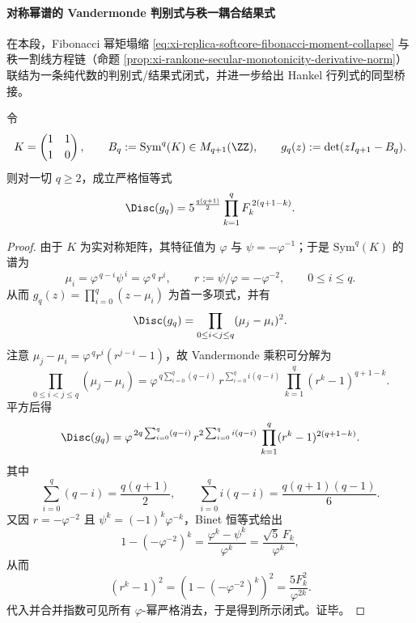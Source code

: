 \paragraph{对称幂谱的 Vandermonde 判别式与秩一耦合结果式}
在本段，Fibonacci 幂矩塌缩 \eqref{eq:xi-replica-softcore-fibonacci-moment-collapse} 与秩一割线方程链（命题 \ref{prop:xi-rankone-secular-monotonicity-derivative-norm}）联结为一条纯代数的判别式/结果式闭式，并进一步给出 Hankel 行列式的同型桥接。

\begin{theorem}\label{thm:xi-symq-k-discriminant-fibonacci-vandermonde}
令
\[
K=\begin{pmatrix}1&1\\[2pt]1&0\end{pmatrix},
\qquad
B_q:=\mathrm{Sym}^q(K)\in M_{q+1}(\ZZ),
\qquad
g_q(z):=\det(zI_{q+1}-B_q).
\]
则对一切 \(q\ge 2\)，成立严格恒等式
\[
\Disc(g_q)
=5^{\frac{q(q+1)}2}\prod_{k=1}^{q}F_k^{\,2(q+1-k)}.
\]
\end{theorem}
\begin{proof}
由于 \(K\) 为实对称矩阵，其特征值为 \(\varphi\) 与 \(\psi=-\varphi^{-1}\)；于是
\(\mathrm{Sym}^q(K)\) 的谱为
\[
\mu_i=\varphi^{\,q-i}\psi^{\,i}=\varphi^{\,q}\,r^i,
\qquad
r:=\psi/\varphi=-\varphi^{-2},
\qquad
0\le i\le q.
\]
从而 \(g_q(z)=\prod_{i=0}^{q}(z-\mu_i)\) 为首一多项式，并有
\[
\Disc(g_q)=\prod_{0\le i<j\le q}(\mu_j-\mu_i)^2.
\]
注意
\(
\mu_j-\mu_i=\varphi^{\,q}r^i(r^{j-i}-1)
\)，故 Vandermonde 乘积可分解为
\[
\prod_{0\le i<j\le q}(\mu_j-\mu_i)
=\varphi^{\,q\sum_{i=0}^{q}(q-i)}\,
r^{\sum_{i=0}^{q}i(q-i)}\,
\prod_{k=1}^{q}(r^k-1)^{q+1-k}.
\]
平方后得
\[
\Disc(g_q)
=\varphi^{\,2q\sum_{i=0}^{q}(q-i)}\,
r^{2\sum_{i=0}^{q}i(q-i)}\,
\prod_{k=1}^{q}(r^k-1)^{2(q+1-k)}.
\]
其中
\[
\sum_{i=0}^{q}(q-i)=\frac{q(q+1)}2,
\qquad
\sum_{i=0}^{q}i(q-i)=\frac{q(q+1)(q-1)}6.
\]
又因 \(r=-\varphi^{-2}\) 且 \(\psi^k=(-1)^k\varphi^{-k}\)，Binet 恒等式给出
\[
1-(-\varphi^{-2})^k
=\frac{\varphi^k-\psi^k}{\varphi^k}
=\frac{\sqrt5\,F_k}{\varphi^k},
\]
从而
\[
(r^k-1)^2=(1-(-\varphi^{-2})^k)^2=\frac{5F_k^2}{\varphi^{2k}}.
\]
代入并合并指数可见所有 \(\varphi\)-幂严格消去，于是得到所示闭式。证毕。
\end{proof}


